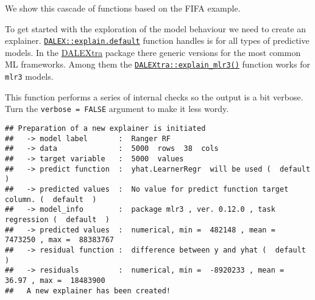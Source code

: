\documentclass[
]{scrbook}
\newenvironment{Shaded}{\begin{snugshade}}{\end{snugshade}}
\newcommand{\AttributeTok}[1]{\textcolor[rgb]{0.77,0.63,0.00}{#1}}
\newcommand{\ConstantTok}[1]{\textcolor[rgb]{0.00,0.00,0.00}{#1}}
\newcommand{\FunctionTok}[1]{\textcolor[rgb]{0.00,0.00,0.00}{#1}}
\newcommand{\NormalTok}[1]{#1}
\newcommand{\OtherTok}[1]{\textcolor[rgb]{0.56,0.35,0.01}{#1}}
\newcommand{\SpecialCharTok}[1]{\textcolor[rgb]{0.00,0.00,0.00}{#1}}
\newcommand{\StringTok}[1]{\textcolor[rgb]{0.31,0.60,0.02}{#1}}
\renewenvironment{Shaded} {\begin{snugshade}\small} {\end{snugshade}}
\begin{document}
We show this cascade of functions based on the FIFA example.

To get started with the exploration of the model behaviour we need to create an explainer. \href{https://www.rdocumentation.org/packages/DALEX/topics/explain.default}{\texttt{DALEX::explain.default}} function handles is for all types of predictive models. In the \href{https://cran.r-project.org/package=DALEXtra}{DALEXtra} package there generic versions for the most common ML frameworks. Among them the \href{https://www.rdocumentation.org/packages/DALEXtra/topics/explain_mlr3}{\texttt{DALEXtra::explain\_mlr3()}} function works for \texttt{mlr3} models.

This function performs a series of internal checks so the output is a bit verbose. Turn the \texttt{verbose\ =\ FALSE} argument to make it less wordy.

\begin{Shaded}
\end{Shaded}

\begin{verbatim}
## Preparation of a new explainer is initiated
##   -> model label       :  Ranger RF 
##   -> data              :  5000  rows  38  cols 
##   -> target variable   :  5000  values 
##   -> predict function  :  yhat.LearnerRegr  will be used (  default  )
##   -> predicted values  :  No value for predict function target column. (  default  )
##   -> model_info        :  package mlr3 , ver. 0.12.0 , task regression (  default  ) 
##   -> predicted values  :  numerical, min =  482148 , mean =  7473250 , max =  88383767  
##   -> residual function :  difference between y and yhat (  default  )
##   -> residuals         :  numerical, min =  -8920233 , mean =  36.97 , max =  18483900  
##   A new explainer has been created!
\end{verbatim}
\end{document}
